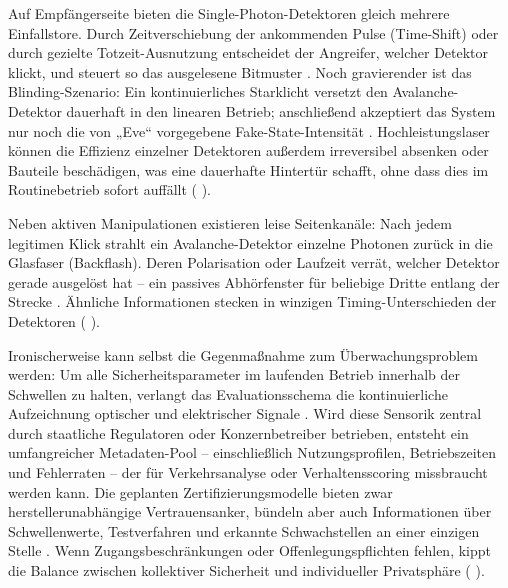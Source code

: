 {Auf Empfängerseite bieten die Single-Photon-Detektoren gleich mehrere Einfallstore. Durch Zeitverschiebung der ankommenden Pulse (Time-Shift) oder durch gezielte Totzeit-Ausnutzung entscheidet der Angreifer, welcher Detektor klickt, und steuert so das ausgelesene Bitmuster . Noch gravierender ist das Blinding-Szenario: Ein kontinuierliches Starklicht versetzt den Avalanche-Detektor dauerhaft in den linearen Betrieb; anschließend akzeptiert das System nur noch die von „Eve“ vorgegebene Fake-State-Intensität . Hochleistungslaser können die Effizienz einzelner Detektoren außerdem irreversibel absenken oder Bauteile beschädigen, was eine dauerhafte Hintertür schafft, ohne dass dies im Routinebetrieb sofort auffällt (\cite{sunReviewSecurityEvaluation2022} ).

Neben aktiven Manipulationen existieren leise Seitenkanäle: Nach jedem legitimen Klick strahlt ein Avalanche-Detektor einzelne Photonen zurück in die Glasfaser (Backflash). Deren Polarisation oder Laufzeit verrät, welcher Detektor gerade ausgelöst hat – ein passives Abhörfenster für beliebige Dritte entlang der Strecke . Ähnliche Informationen stecken in winzigen Timing-Unterschieden der Detektoren (\cite{sunReviewSecurityEvaluation2022} ).

Ironischerweise kann selbst die Gegenmaßnahme zum Überwachungsproblem werden: Um alle Sicherheitsparameter im laufenden Betrieb innerhalb der Schwellen zu halten, verlangt das Evaluationsschema die kontinuierliche Aufzeichnung optischer und elektrischer Signale . Wird diese Sensorik zentral durch staatliche Regulatoren oder Konzernbetreiber betrieben, entsteht ein umfangreicher Metadaten-Pool – einschließlich Nutzungsprofilen, Betriebszeiten und Fehlerraten – der für Verkehrsanalyse oder Verhaltensscoring missbraucht werden kann. Die geplanten Zertifizierungsmodelle bieten zwar herstellerunabhängige Vertrauensanker, bündeln aber auch Informationen über Schwellenwerte, Testverfahren und erkannte Schwachstellen an einer einzigen Stelle . Wenn Zugangsbeschränkungen oder Offenlegungspflichten fehlen, kippt die Balance zwischen kollektiver Sicherheit und individueller Privatsphäre (\cite{sunReviewSecurityEvaluation2022} ).






}

